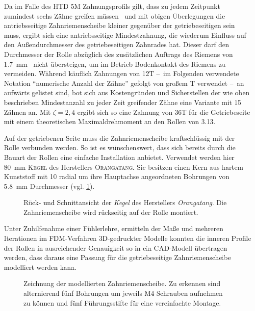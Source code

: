 		Da im Falle des HTD 5M Zahnungsprofils gilt, dass zu jedem Zeitpunkt zumindest sechs Zähne greifen müssen~\cite{MAEDLERGmbH.2021} und mit obigen Überlegungen die antriebsseitige Zahnriemenscheibe kleiner gegenüber der getriebeseitigen sein muss, ergibt sich eine antriebsseitige Mindestzahnung, die wiederum Einfluss auf den Außendurchmesser des getriebeseitigen Zahnrades hat.
		Dieser darf den Durchmesser der Rolle abzüglich des zusätzlichen Auftrags des Riemens von \qty{1,7}{\milli\metre}~\cite{gates.catalogue.2021} nicht übersteigen, um im Betrieb Bodenkontakt des Riemens zu vermeiden.
		Während käuflich Zahnungen von 12T --~im Folgenden verwendete Notation ``numerische Anzahl der Zähne'' gefolgt von großem T verwendet --~an aufwärts gelistet sind, bot sich aus Kostengründen und Sicherstellen der wie oben beschrieben Mindestanzahl zu jeder Zeit greifender Zähne eine Variante mit 15 Zähnen an.
		Mit \(\zeta=2,4\) ergibt sich so eine Zahnung von 36T für die Getriebeseite mit einem theoretischen Maximaldrehmoment an den Rollen von \qty{3,13}{\newtonmetre}.\par\medskip
		Auf der getriebenen Seite muss die Zahnriemenscheibe kraftschlüssig mit der Rolle verbunden werden.
		So ist es wünschenswert, dass sich bereits durch die Bauart der Rollen eine einfache Installation anbietet.
		Verwendet werden hier \qty{80}{\milli\metre} \textsc{Kegel} des Herstellers \textsc{Orangatang}.
		Sie besitzen einen Kern aus hartem Kunststoff mit 10 radial um ihre Hauptachse angeordneten Bohrungen von \qty{5,8}{\milli\metre} Durchmesser (vgl. \cref{fig:kegels}).
		\begin{figure}[h]
			\centering
			
			\caption[Rück- und Schnittansicht der \textit{Kegel} des Herstellers \textit{Orangatang}]{Rück- und Schnittansicht der \textit{Kegel} des Herstellers \textit{Orangatang}. Die Zahnriemenscheibe wird rückseitig auf der Rolle montiert.}%
			\label{fig:kegels}
		\end{figure}
		Unter Zuhilfenahme einer Fühlerlehre, ermitteln der Maße und mehreren Iterationen im FDM-Verfahren 3D-gedruckter Modelle konnten die inneren Profile der Rollen in ausreichender Genauigkeit so in ein CAD-Modell übertragen werden, dass daraus eine Passung für die getriebeseitige Zahnriemenscheibe modelliert werden kann.
		\begin{figure}[h]
			\centering
			
			\caption[Zeichnung der modellierten Zahnriemenscheibe]{Zeichnung der modellierten Zahnriemenscheibe. Zu erkennen sind alternierend fünf Bohrungen um jeweils M4 Schrauben aufnehmen zu können und fünf Führungsstifte für eine vereinfachte Montage.}%
			\label{fig:htd 5m driven}
		\end{figure}

